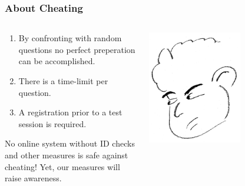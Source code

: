 \begin{frame}
  \frametitle{About Cheating}
  \begin{columns}
   \begin{column}{.5\textwidth}
     \begin{enumerate}
      \item By confronting with random questions no perfect preperation can be accomplished.
      \item There is a time-limit per question.
      \item A registration prior to a test session is required.
     \end{enumerate}
    No online system without ID checks and other measures is safe against cheating! Yet, our measures will raise awareness.
   \end{column}
   \begin{column}{.5\textwidth}
       \centering
      \includegraphics[width=0.6\textwidth]{images/cheating}
    \end{column}
  \end{columns}
\end{frame}


